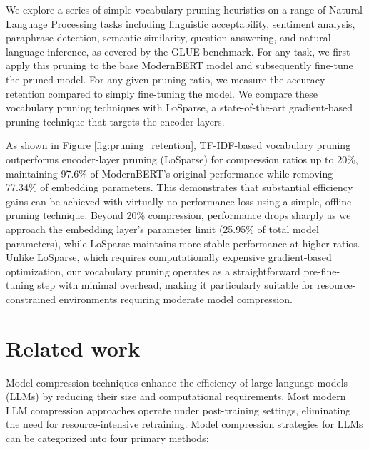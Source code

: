 \documentclass[twocolumn]{article}
\begin{document}
We explore a series of simple vocabulary pruning heuristics on a range of Natural Language Processing tasks including linguistic acceptability, sentiment analysis, paraphrase detection, semantic similarity, question answering, and natural language inference, as covered by the GLUE benchmark. For any task, we first apply this pruning to the base ModernBERT model and subsequently fine-tune the pruned model. For any given pruning ratio, we measure the accuracy retention compared to simply fine-tuning the model. We compare these vocabulary pruning techniques with LoSparse, a state-of-the-art gradient-based pruning technique that targets the encoder layers.

As shown in Figure \ref{fig:pruning_retention}, TF-IDF-based vocabulary pruning outperforms encoder-layer pruning (LoSparse) for compression ratios up to 20\%, maintaining 97.6\% of ModernBERT's original performance while removing 77.34\% of embedding parameters. This demonstrates that substantial efficiency gains can be achieved with virtually no performance loss using a simple, offline pruning technique. Beyond 20\% compression, performance drops sharply as we approach the embedding layer's parameter limit (25.95\% of total model parameters), while LoSparse maintains more stable performance at higher ratios. Unlike LoSparse, which requires computationally expensive gradient-based optimization, our vocabulary pruning operates as a straightforward pre-fine-tuning step with minimal overhead, making it particularly suitable for resource-constrained environments requiring moderate model compression.

\section{Related work}
Model compression techniques enhance the efficiency of large language models (LLMs) by reducing their size and computational requirements. Most modern LLM compression approaches operate under post-training settings, eliminating the need for resource-intensive retraining. Model compression strategies for LLMs can be categorized into four primary methods:
\end{document}

